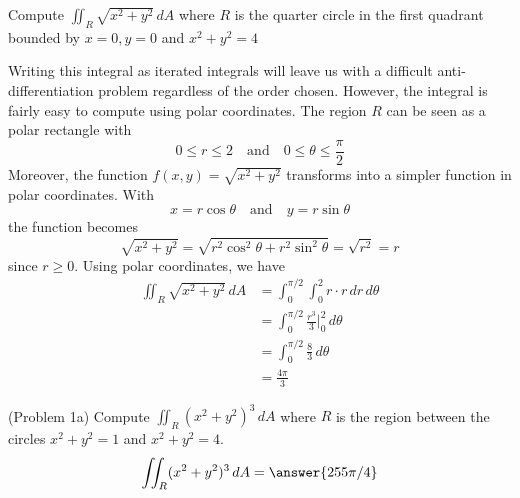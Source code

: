 \documentclass[handout]{ximera}
\begin{document}
\begin{example}[Example 1]
Compute $\iint_R \sqrt{x^2 + y^2} \, dA$ where $R$ is the quarter circle in the first quadrant bounded by $x=0, y=0$ and $x^2 + y^2 = 4$\\

\begin{image}
\end{image}
Writing this integral as iterated integrals will leave us with a difficult anti-differentiation problem regardless of the order chosen.
However, the integral is fairly easy to compute using polar coordinates. The region $R$ can be seen as a polar rectangle with 
\[
0\leq r \leq 2 \quad \text{and} \quad 0 \leq \theta \leq \frac{\pi}{2}
\]
Moreover, the function $f(x,y) = \sqrt{x^2 + y^2}$ transforms into a simpler function in polar coordinates. With
\[
x = r\cos \theta \quad \text{and} \quad y = r\sin \theta
\]
the function becomes
\[
\sqrt{x^2 +y^2} = \sqrt{r^2 \cos^2 \theta + r^2 \sin^2 \theta} = \sqrt{r^2} = r
\]
since $r \geq 0$.
Using polar coordinates, we have
\begin{align*}
\iint_R \sqrt{x^2 + y^2} \, dA & = \int_0^{\pi/2} \int_0^2 r \cdot r \, dr \, d\theta\\
                 & = \int_0^{\pi/2}  \frac{r^3}{3} \bigg|_{0}^2 \, d\theta\\
                 & = \int_0^{\pi/2} \frac83\, d\theta\\
                 &= \frac{4\pi}{3}
\end{align*}  

\end{example}

\begin{problem}(Problem 1a)
Compute $\iint_R (x^2 + y^2)^3 \, dA$ where $R$ is the region between the circles $x^2 + y^2 = 1$ and $x^2 + y^2 = 4$.\\
\[
\iint_R (x^2 + y^2)^3 \, dA = \answer{255\pi/4}
\]
\end{problem}
\end{document}
